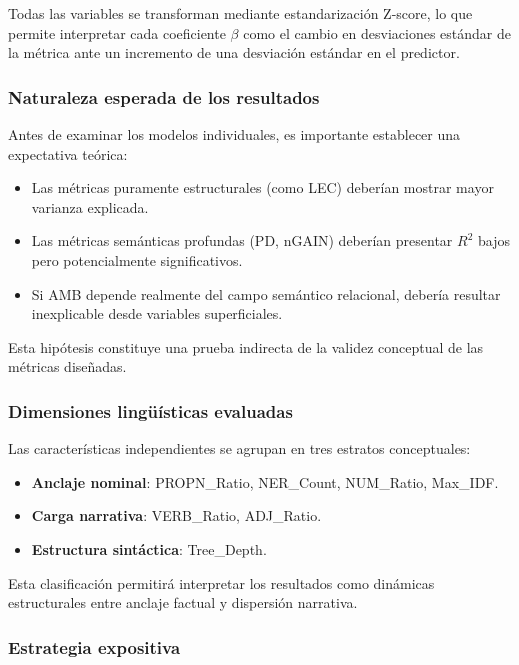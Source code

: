 Todas las variables se transforman mediante estandarización Z-score, lo que permite interpretar cada coeficiente $\beta$ como el cambio en desviaciones estándar de la métrica ante un incremento de una desviación estándar en el predictor.

\subsubsection{Naturaleza esperada de los resultados}

Antes de examinar los modelos individuales, es importante establecer una expectativa teórica:

\begin{itemize}
\item Las métricas puramente estructurales (como LEC) deberían mostrar mayor varianza explicada.
\item Las métricas semánticas profundas (PD, nGAIN) deberían presentar $R^2$ bajos pero potencialmente significativos.
\item Si AMB depende realmente del campo semántico relacional, debería resultar inexplicable desde variables superficiales.
\end{itemize}

Esta hipótesis constituye una prueba indirecta de la validez conceptual de las métricas diseñadas.

\subsubsection{Dimensiones lingüísticas evaluadas}

Las características independientes se agrupan en tres estratos conceptuales:

\begin{itemize}
\item \textbf{Anclaje nominal}: PROPN\_Ratio, NER\_Count, NUM\_Ratio, Max\_IDF.
\item \textbf{Carga narrativa}: VERB\_Ratio, ADJ\_Ratio.
\item \textbf{Estructura sintáctica}: Tree\_Depth.
\end{itemize}

Esta clasificación permitirá interpretar los resultados como dinámicas estructurales entre anclaje factual y dispersión narrativa.

\subsubsection{Estrategia expositiva}


